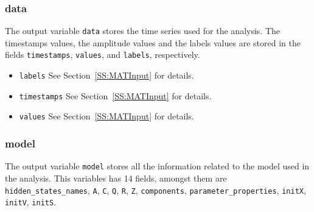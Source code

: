 \subsubsection{data} 

The output variable \lstinline[basicstyle = \mlttfamily \small]!data! stores the time series used for the analysis. 
The timestamps values, the amplitude values and the labels values are stored in the fields \lstinline[basicstyle = \mlttfamily \small ]!timestamps!, \lstinline[basicstyle = \mlttfamily \small ]!values!, and \lstinline[basicstyle = \mlttfamily \small ]!labels!, respectively.
\begin{itemize}
\item \lstinline[basicstyle = \mlttfamily \small ]!labels!  See Section~\ref{SS:MATInput} for details.
\item \lstinline[basicstyle = \mlttfamily \small ]!timestamps!  See Section~\ref{SS:MATInput} for details.
\item \lstinline[basicstyle = \mlttfamily \small ]!values!  See Section~\ref{SS:MATInput} for details.
\end{itemize}

\subsubsection{model}
The output variable \lstinline[basicstyle = \mlttfamily \small]!model! stores all the information related to the model used in the analysis. 
This variables has 14 fields, amongst them are \lstinline[basicstyle = \mlttfamily \small ]!hidden_states_names!, \lstinline[basicstyle = \mlttfamily \small ]!A!, \lstinline[basicstyle = \mlttfamily \small ]!C!, \lstinline[basicstyle = \mlttfamily \small ]!Q!, \lstinline[basicstyle = \mlttfamily \small ]!R!, \lstinline[basicstyle = \mlttfamily \small ]!Z!, \lstinline[basicstyle = \mlttfamily \small ]!components!, \lstinline[basicstyle = \mlttfamily \small ]!parameter_properties!, \lstinline[basicstyle = \mlttfamily \small ]!initX!, \lstinline[basicstyle = \mlttfamily \small ]!initV!, \lstinline[basicstyle = \mlttfamily \small ]!initS!.


